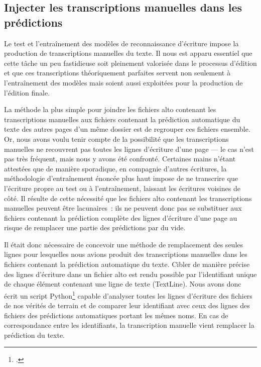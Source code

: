 \documentclass[a4paper,12pt,twoside]{book}
\begin{document}
			\subsection{Injecter les transcriptions manuelles dans les \glspl{prédiction}}
				\label{injection}
				Le test et l'entraînement des modèles de reconnaissance d'écriture impose la production de transcriptions manuelles du texte. Il nous est apparu essentiel que cette tâche un peu fastidieuse soit pleinement valorisée dans le processus d'édition et que ces transcriptions théoriquement parfaites servent non seulement à l'entraînement des modèles mais soient aussi exploitées pour la production de l'édition finale.
				
				La méthode la plus simple pour joindre les fichiers \gls{alto} contenant les transcriptions manuelles aux fichiers contenant la \gls{prédiction} automatique du texte des autres pages d'un même dossier est de regrouper ces fichiers ensemble. Or, nous avons voulu tenir compte de la possibilité que les transcriptions manuelles ne recouvrent pas toutes les lignes d'écriture d'une page --- le cas n'est pas très fréquent, mais nous y avons été confronté. Certaines mains n'étant attestées que de manière sporadique, en compagnie d'autres écritures, la méthodologie d'entraînement énoncée plus haut impose de ne transcrire que l'écriture propre au test ou à l'entraînement, laissant les écritures voisines de côté. Il résulte de cette nécessité que les fichiers \gls{alto} contenant les transcriptions manuelles peuvent être lacunaires~: ils ne peuvent donc pas se substituer aux fichiers contenant la \gls{prédiction} complète des lignes d'écriture d'une page au risque de remplacer une partie des \glspl{prédiction} par du vide. 
				
				Il était donc nécessaire de concevoir une méthode de remplacement des seules lignes pour lesquelles nous avions produit des transcriptions manuelles dans les fichiers contenant la \gls{prédiction} automatique du texte. Cibler de manière précise des lignes d'écriture dans un fichier \gls{alto} est rendu possible par l'identifiant unique de chaque élément contenant une ligne de texte (\textsf{TextLine}). Nous avons donc écrit un script Python\footcite{biayInjectTranscriptPy2022a} capable d'analyser toutes les lignes d'écriture des fichiers de nos vérités de terrain et de comparer leur identifiant avec ceux des lignes des fichiers des \glspl{prédiction} automatiques portant les mêmes noms. En cas de correspondance entre les identifiants, la transcription manuelle vient remplacer la \gls{prédiction} du texte.
			
\end{document}
